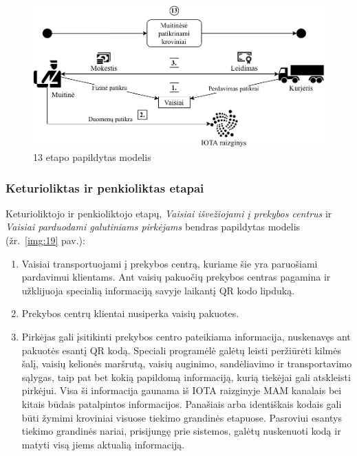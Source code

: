 \begin{figure}[H]
    \centering
    \includegraphics[scale=0.8]{images/iota-usecase-13}
    \caption{13 etapo papildytas modelis}
    \label{img:18}
\end{figure}




\subsubsection{Keturioliktas ir penkioliktas etapai} \label{subsection:uc-14-15}

Keturioliktojo ir penkioliktojo etapų, \textit{Vaisiai išvežiojami į prekybos centrus} ir \textit{Vaisiai parduodami galutiniams pirkėjams} bendras papildytas modelis (žr.~\ref{img:19} pav.):
\begin{enumerate}
    \item Vaisiai transportuojami į prekybos centrą, kuriame šie yra paruošiami pardavimui klientams. Ant vaisių pakuočių prekybos centras pagamina ir užklijuoja specialią informaciją savyje laikantį QR kodo lipduką.
    \item Prekybos centrų klientai nusiperka vaisių pakuotes.
    \item Pirkėjas gali įsitikinti prekybos centro pateikiama informacija, nuskenavęs ant pakuotės esantį QR kodą. Speciali programėlė galėtų leisti peržiūrėti kilmės šalį, vaisių kelionės maršrutą, vaisių auginimo, sandėliavimo ir transportavimo sąlygas, taip pat bet kokią papildomą informaciją, kurią tiekėjai gali atskleisti pirkėjui. Visa ši informacija gaunama iš IOTA raizginyje MAM kanalais bei kitais būdais patalpintos informacijos. Panašiais arba identiškais kodais gali būti žymimi kroviniai visuose tiekimo grandinės etapuose. Pasroviui esantys tiekimo grandinės nariai, prisijungę prie sistemos, galėtų nuskenuoti kodą ir matyti visą jiems aktualią informaciją.
\end{enumerate}

